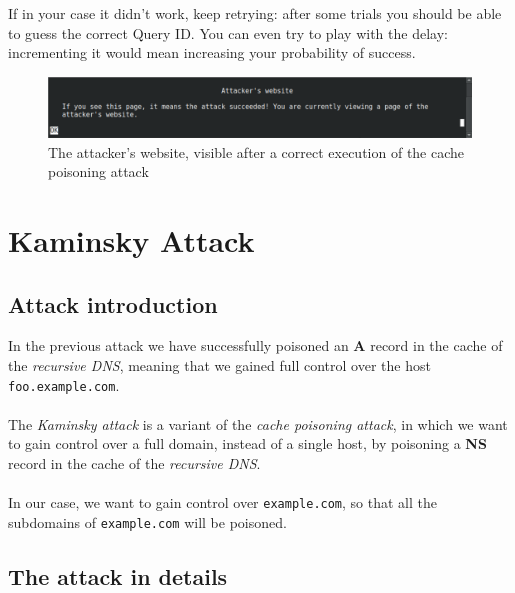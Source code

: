 \documentclass[11pt,a4paper]{article}
\begin{document}
\noindent
If in your case it didn't work, keep retrying: after some trials you should be able to guess the correct Query ID. You can even try to play with the delay: incrementing it would mean increasing your probability of success.

\begin{figure}[h!]
    \centering
    \includegraphics[width=\textwidth]{attacker-website.png}
    \caption{The attacker's website, visible after a correct execution of the cache poisoning attack}
    \label{fig:attacker-website}
\end{figure}

\newpage
\section{Kaminsky Attack}

\subsection{Attack introduction}

In the previous attack we have successfully poisoned an \textbf{A} record in the
cache of the \emph{recursive DNS}, meaning that we gained full control over the
host \texttt{foo.example.com}.
\\
\\
\noindent
The \emph{Kaminsky attack} is a variant of the \emph{cache poisoning attack}, in
which we want to gain control over a full domain, instead of a single host, by
poisoning a \textbf{NS} record in the cache of the \emph{recursive DNS}.
\\
\\
\noindent
In our case, we want to gain control over \texttt{example.com}, so that all the
subdomains of \texttt{example.com} will be poisoned.

\subsection{The attack in details}
\end{document}
